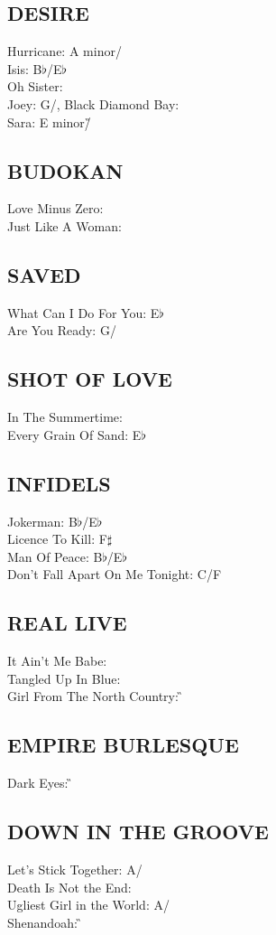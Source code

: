 \subsection{DESIRE}
Hurricane: A minor/\C\\ Isis: B$\flat$/E$\flat$\\ Oh Sister: \G\\ Joey: G/\C,
Black Diamond Bay: \G\\ Sara: E minor/\G


\subsection{BUDOKAN}
Love Minus Zero: \D\\ Just Like A Woman: \E


\subsection{SAVED}
What Can I Do For You: E$\flat$\\ Are You Ready: G/\C


\subsection{SHOT OF LOVE}
In The Summertime: \A\\ Every Grain Of Sand: E$\flat$


\subsection{INFIDELS}
Jokerman: B$\flat$/E$\flat$\\ Licence To Kill: F$\sharp$\\ Man Of Peace: B$\flat$/E$\flat$\\ Don't Fall Apart On Me Tonight: C/F


\subsection{REAL LIVE}
It Ain't Me Babe: \G\\ Tangled Up In Blue: \A\\ Girl From The North Country: \G


\subsection{EMPIRE BURLESQUE}
Dark Eyes: \G


\subsection{DOWN IN THE GROOVE}
Let's Stick Together: A/\D\\ Death Is Not the End: \A\\ Ugliest Girl in the World: A/\D\\ Shenandoah: \G


